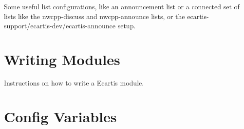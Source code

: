 \documentclass{book}
\begin{document}
Some useful list configurations, like an announcement list or a connected set
of lists like the nwcpp-discuss and nwcpp-announce lists, or the
ecartis-support/ecartis-dev/ecartis-announce setup.
   
   
\chapter{Writing Modules}

Instructions on how to write a Ecartis module.




\appendix
\chapter{Config Variables}
\label{config}
\end{document}

